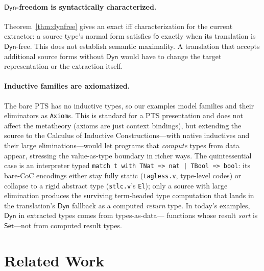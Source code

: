 \documentclass[acmsmall,anonymous=false,nonacm]{acmart}
\newcommand{\dyn}{\ensuremath{\mathsf{Dyn}}}
\newcommand{\Set}{\ensuremath{\mathsf{Set}}}
\begin{document}
\paragraph{$\dyn$-freedom is syntactically characterized.}
Theorem~\ref{thm:dynfree} gives an exact iff characterization for the current
extractor: a source type's normal form satisfies $\mathsf{fo}$ exactly when its
translation is $\dyn$-free. This does not establish semantic maximality. A
translation that accepts additional source forms without $\dyn$ would have to
change the target representation or the extraction itself.

\paragraph{Inductive families are axiomatized.}
The bare PTS has no inductive types, so our examples model families and their
eliminators as \texttt{Axiom}s. This is standard for a PTS presentation and does
not affect the metatheory (axioms are just context bindings), but extending the
source to the Calculus of Inductive Constructions---with native inductives and
their large eliminations---would let programs that \emph{compute} types from data
appear, stressing the value-as-type boundary in richer ways. The quintessential
case is an interpreter typed
\texttt{match t with TNat => nat | TBool => bool}: its bare-CoC encodings
either stay fully static (\texttt{tagless.v}, type-level codes) or collapse to
a rigid abstract type (\texttt{stlc.v}'s \texttt{El}); only a source with
large elimination produces the surviving term-headed type computation that
lands in the translation's $\dyn$ fallback as a computed \emph{return} type.
In today's examples, $\dyn$ in extracted types comes from types-as-data---%
functions whose result \emph{sort} is \Set---not from computed result types.

\section{Related Work}\label{sec:related}
\end{document}
